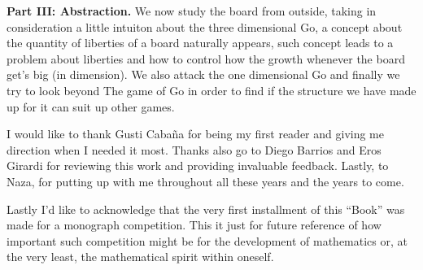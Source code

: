 \textbf{Part III: Abstraction.} We now study the board from outside, taking in consideration a little intuiton about the three dimensional Go, a concept about the quantity of liberties of a board naturally appears, such concept leads to a problem about liberties and how to control how the growth whenever the board get's big (in dimension). We also attack the one dimensional Go and finally we try to look beyond The game of Go in order to find if the structure we have made up for it can suit up other games.

\vfill

I would like to thank Gusti Cabaña for being my first reader and giving me direction when I needed it most. Thanks also go to Diego Barrios and Eros Girardi for reviewing this work and providing invaluable feedback. Lastly, to Naza, for putting up with me throughout all these years and the years to come.

Lastly I'd like to acknowledge that the very first installment of this ``Book'' was made for a monograph competition. This it just for future reference of how important such competition might be for the development of mathematics or, at the very least, the mathematical spirit within oneself.
\clearpage

\tableofcontents
\thispagestyle{empty}
\clearpage